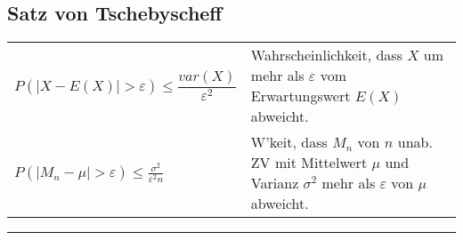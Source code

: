 \subsection{Satz von Tschebyscheff }
\begin{tabular}{ll}
  $P(\left| X-E(X) \right|>\varepsilon)\leq\dfrac{var(X)}{\varepsilon^2}$ &
  Wahrscheinlichkeit, dass $X$ um mehr als $\varepsilon$ vom Erwartungswert $E(X)$ abweicht.\\
  $P(|M_{n}-\mu|>\varepsilon)\leq \frac{\sigma^{2}}{\varepsilon^{2}n} $ &
  W'keit, dass $M_{n}$ von $n$ unab. ZV mit Mittelwert $\mu$ und Varianz $\sigma^{2}$ mehr als $\varepsilon$ von $\mu$ abweicht.
\end{tabular}
\vspace{1mm}
\hrule
\vspace{4mm}

